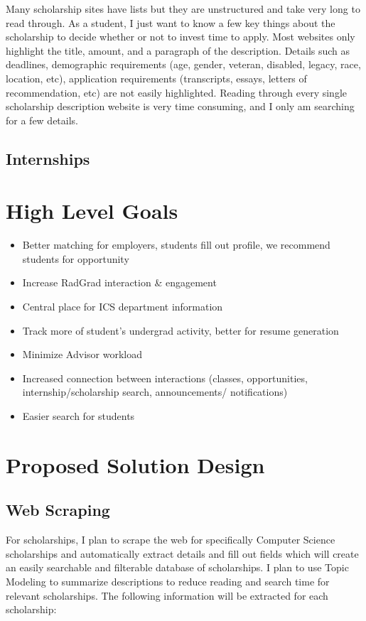 \documentclass[english]{proposalnsf}
\begin{document}
	Many scholarship sites have lists but they are unstructured and take very long to read through. As a student, I just want to know a few key things about the scholarship to decide whether or not to invest time to apply. Most websites only highlight the title, amount, and a paragraph of the description. Details such as deadlines, demographic requirements (age, gender, veteran, disabled, legacy, race, location, etc), application requirements (transcripts, essays, letters of recommendation, etc) are not easily highlighted. Reading through every single scholarship description website is very time consuming, and I only am searching for a few details.
	
	
	\subsection{Internships}
	

	
	\section{High Level Goals}
	\label{Goals}
	\begin{itemize}
		\item  Better matching for employers, students fill out profile, we recommend students for opportunity
		\item Increase RadGrad interaction \& engagement
		\item Central place for ICS department information
		\item Track more of student's undergrad activity, better for resume generation
		\item Minimize Advisor workload
		\item  Increased connection between interactions (classes, opportunities, internship/scholarship search, announcements/ notifications)
		\item Easier search for students
	\end{itemize}
	
	
	
	
	\section{Proposed Solution Design}
	\label{solution-design}
	
		\subsection{Web Scraping}
		For scholarships, I plan to scrape the web for specifically Computer Science scholarships and automatically extract details and fill out fields which will create an easily searchable and filterable database of scholarships. I plan to use Topic Modeling to summarize descriptions to reduce reading and search time for relevant scholarships. The following information will be extracted for each scholarship:
		
\end{document}
